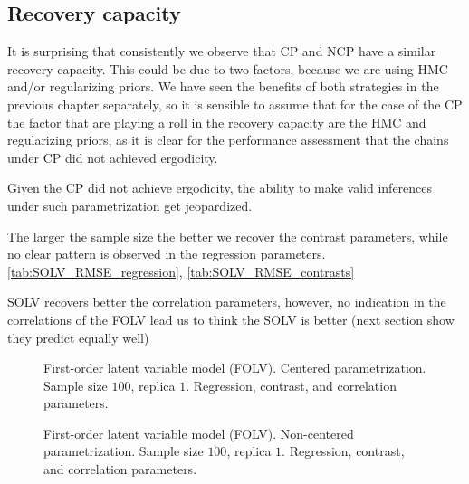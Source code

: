 
\subsection{Recovery capacity}

It is surprising that consistently we observe that CP and NCP have a similar recovery capacity. This could be due to two factors, because we are using HMC and/or regularizing priors. We have seen the benefits of both strategies in the previous chapter separately, so it is sensible to assume that for the case of the CP the factor that are playing a roll in the recovery capacity are the HMC and regularizing priors, as it is clear for the performance assessment that the chains under CP did not achieved ergodicity.

Given the CP did not achieve ergodicity, the ability to make valid inferences under such parametrization get jeopardized.

The larger the sample size the better we recover the contrast parameters, while no clear pattern is observed in the regression parameters.
\ref{tab:SOLV_RMSE_regression}, \ref{tab:SOLV_RMSE_contrasts}


SOLV recovers better the correlation parameters, however, no indication in the correlations of the FOLV lead us to think the SOLV is better (next section show they predict equally well)

%
\begin{figure}[H]
	\centering
	\begin{subfigure}
		\texttt{[image: FOLV\_CE\_J100\_Ndata1\_regression]}
	\end{subfigure}
	\begin{subfigure}
		\texttt{[image: FOLV\_CE\_J100\_Ndata1\_corr]}
	\end{subfigure}
	\caption[First-order latent variable model (FOLV). Centered parametrization. Sample size $100$, replica $1$. Regression, contrast, and correlation parameters.]%
	{First-order latent variable model (FOLV). Centered parametrization. Sample size $100$, replica $1$. Regression, contrast, and correlation parameters.}
	\label{fig:FOLV_CE_recovery1}
\end{figure}
%
\begin{figure}[H]
	\centering
	\begin{subfigure}
		\texttt{[image: FOLV\_NC\_J100\_Ndata1\_regression]}
	\end{subfigure}
	\begin{subfigure}
		\texttt{[image: FOLV\_NC\_J100\_Ndata1\_corr]}
	\end{subfigure}
	\caption[First-order latent variable model (FOLV). Non-centered parametrization. Sample size $100$, replica $1$. Regression, contrast, and correlation parameters.]%
	{First-order latent variable model (FOLV). Non-centered parametrization. Sample size $100$, replica $1$. Regression, contrast, and correlation parameters.}
	\label{fig:FOLV_NC_recovery1}
\end{figure}





